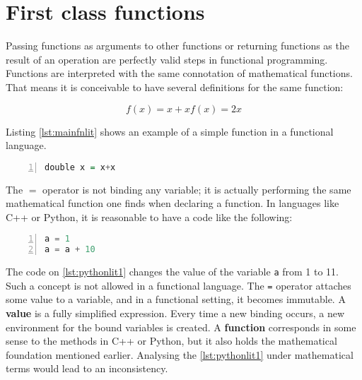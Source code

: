 \section{First class functions}
Passing functions as arguments to other functions or returning functions as the result of an operation are perfectly valid steps in functional programming. Functions are interpreted with the same connotation of mathematical functions. That means it is conceivable to have several definitions for the same function:

\begin{subequations}
\begin{equation}
    f(x) = x + x
\end{equation}
\begin{equation}
    f(x) = 2x
\end{equation}
\end{subequations}

Listing \ref{lst:mainfnlit} shows an example of a simple function in a functional language.

\begin{lstlisting}[language=Haskell, numbers=left, caption={A simple function in a functional language}, captionpos=b, label={lst:mainfnlit}]
double x = x+x
\end{lstlisting}

The $ = $ operator is not binding any variable; it is actually performing the same mathematical function one finds when declaring a function. In languages like C++ or Python, it is reasonable to have a code like the following:

\begin{lstlisting}[language=Python, numbers=left, caption={Mutable references}, captionpos=b, label={lst:pythonlit1}]
a = 1
a = a + 10
\end{lstlisting}

The code on \cref{lst:pythonlit1} changes the value of the variable \lstinline!a! from 1 to 11. Such a concept is not allowed in a functional language. The \lstinline!=! operator attaches some value to a variable, and in a functional setting, it becomes immutable. A \textbf{value} is a fully simplified expression. Every time a new binding occurs, a new environment for the bound variables is created. A \textbf{function} corresponds in some sense to the methods in C++ or Python, but it also holds the mathematical foundation mentioned earlier. Analysing the \cref{lst:pythonlit1} under mathematical terms would lead to an inconsistency. 



